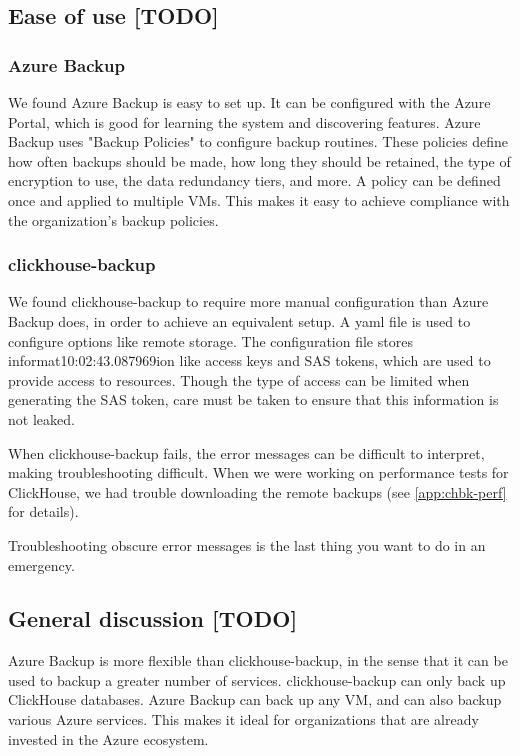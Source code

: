 \subsection{Ease of use [TODO]}

\subsubsection{Azure Backup}

We found Azure Backup is easy to set up.
It can be configured with the Azure Portal,
which is good for learning the system and discovering features.
Azure Backup uses "Backup Policies" to configure backup routines.
These policies define how often backups should be made,
how long they should be retained,
the type of encryption to use,
the data redundancy tiers, and more.
A policy can be defined once and applied to multiple VMs.
This makes it easy to achieve compliance with the organization's backup policies.

\subsubsection{clickhouse-backup}

We found clickhouse-backup to require more manual configuration than Azure Backup does,
in order to achieve an equivalent setup.
A yaml file is used to configure options like remote storage.
The configuration file stores informat10:02:43.087969ion %
like access keys and SAS tokens,
which are used to provide access to resources.
Though the type of access can be limited when generating the SAS token,
care must be taken to ensure that this information is not leaked.

When clickhouse-backup fails,
the error messages can be difficult to interpret,
making troubleshooting difficult.
When we were working on performance tests for ClickHouse,
we had trouble downloading the remote backups (see \ref{app:chbk-perf} for details).

Troubleshooting obscure error messages is the last thing you want to do in an emergency.

\subsection{General discussion [TODO]}

Azure Backup is more flexible than clickhouse-backup,
in the sense that it can be used to backup a greater number of services.
clickhouse-backup can only back up ClickHouse databases.
Azure Backup can back up any VM, and can also backup various Azure services.
This makes it ideal for organizations that are already invested in the Azure ecosystem.

